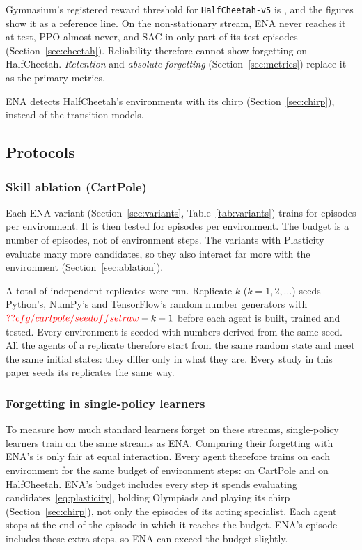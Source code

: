Gymnasium's registered reward threshold for \texttt{HalfCheetah-v5} is , and the figures show it as a reference line. On the non-stationary stream, ENA never reaches it at test, PPO almost never, and SAC in only part of its test episodes (Section~\ref{sec:cheetah}). Reliability therefore cannot show forgetting on HalfCheetah. \textit{Retention} and \textit{absolute forgetting} (Section~\ref{sec:metrics}) replace it as the primary metrics.


ENA detects HalfCheetah's environments with its chirp (Section~\ref{sec:chirp}), instead of the transition models.

\subsection{Protocols}
\label{sec:protocols}

\subsubsection{Skill ablation (CartPole)}
Each ENA variant (Section~\ref{sec:variants}, Table~\ref{tab:variants}) trains for  episodes per environment. It is then tested for  episodes per environment. The budget is a number of episodes, not of environment steps. The variants with Plasticity evaluate many more candidates, so they also interact far more with the environment (Section~\ref{sec:ablation}).

A total of  independent replicates were run. Replicate $k$ ($k = 1, 2, \dots$) seeds Python's, NumPy's and TensorFlow's random number generators with $\Res{cfg/cartpole/seedoffsetraw} + k - 1$ before each agent is built, trained and tested. Every environment is seeded with numbers derived from the same seed. All the agents of a replicate therefore start from the same random state and meet the same initial states: they differ only in what they are. Every study in this paper seeds its replicates the same way.

\subsubsection{Forgetting in single-policy learners}
\label{sec:forgetting_protocol}
To measure how much standard learners forget on these streams, single-policy learners train on the same streams as ENA. Comparing their forgetting with ENA's is only fair at equal interaction. Every agent therefore trains on each environment for the same budget of environment steps:  on CartPole and  on HalfCheetah. ENA's budget includes every step it spends evaluating candidates~\eqref{eq:plasticity}, holding Olympiads and playing its chirp (Section~\ref{sec:chirp}), not only the episodes of its acting specialist. Each agent stops at the end of the episode in which it reaches the budget. ENA's episode includes these extra steps, so ENA can exceed the budget slightly.

